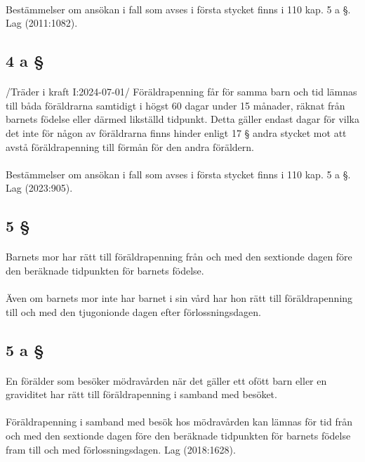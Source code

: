 \documentclass[a4paper,notitlepage,openany,10pt]{book}
\begin{document}
\paragraph*{}
Bestämmelser om ansökan i fall som avses i första stycket finns i 110 kap. 5 a §.
Lag (2011:1082).
\subsection*{4 a §}
\paragraph*{}
/Träder i kraft I:2024-07-01/
Föräldrapenning får för samma barn och tid lämnas till båda föräldrarna samtidigt i högst 60 dagar under 15 månader, räknat från barnets födelse eller därmed likställd tidpunkt. Detta gäller endast dagar för vilka det inte för någon av föräldrarna finns hinder enligt 17 § andra stycket mot att avstå föräldrapenning till förmån för den andra föräldern.
\paragraph*{}
Bestämmelser om ansökan i fall som avses i första stycket finns i 110 kap. 5 a §.
Lag (2023:905).
\subsection*{5 §}
\paragraph*{}
Barnets mor har rätt till föräldrapenning från och med den sextionde dagen före den beräknade tidpunkten för barnets födelse.
\paragraph*{}
Även om barnets mor inte har barnet i sin vård har hon rätt till föräldrapenning till och med den tjugonionde dagen efter förlossningsdagen.
\subsection*{5 a §}
\paragraph*{}
En förälder som besöker mödravården när det gäller ett ofött barn eller en graviditet har rätt till föräldrapenning i samband med besöket.
\paragraph*{}
Föräldrapenning i samband med besök hos mödravården kan lämnas för tid från och med den sextionde dagen före den beräknade tidpunkten för barnets födelse fram till och med förlossningsdagen.
Lag (2018:1628).
\end{document}
